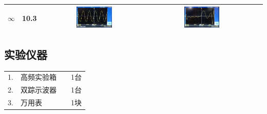 \documentclass[12pt]{article}%
\numberwithin{equation}{section}
\begin{document}
\begin{table}[htbp]
\begin{tabular}{|c|c|c|c|c|}
$\infty$     &    10.3       &  \includegraphics[width=0.35\textwidth]{gaopin4/gaopin417.jpg} &   \includegraphics[width=0.35\textwidth]{gaopin4/gaopin415.jpg}   \\\hline
\end{tabular}
\end{table}
\subsection{实验仪器}
\begin{tabular}{clcc}
1.&	高频实验箱                &&        1台 \\
2.&	双踪示波器           &&             1台\\
3.&	万用表           &&             1块\\
\end{tabular}
\end{document}
